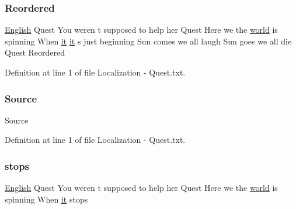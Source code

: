 \subsubsection{\texorpdfstring{Reordered}{Reordered}}
{\footnotesize\ttfamily \mbox{\hyperlink{_sphere_i_i_01_winter_01_project_2_config_2_localization_8txt_ad896b63205779b1b09e86d941ce13976}{English}} Quest You weren t supposed to help her Quest Here we the \mbox{\hyperlink{_sphere_i_i_01_music_01_boxes_2_config_2_localization_8txt_a7ede01351426b1b7f6c1ce5f794e474f}{world}} is spinning When \mbox{\hyperlink{_the_01_restless_01_curse_2_config_2_localization_01-_01_quest_8txt_a741b285909bea4855b886664c2dcd50c}{it}} \mbox{\hyperlink{_the_01_restless_01_curse_2_config_2_localization_01-_01_quest_8txt_a741b285909bea4855b886664c2dcd50c}{it}} s just beginning Sun comes we all laugh Sun goes we all die Quest Reordered}



Definition at line 1 of file Localization -\/ Quest.\+txt.

\mbox{\label{_the_01_restless_01_curse_2_config_2_localization_01-_01_quest_8txt_a176e1eca2d1e3d1c6a064340bc6a351e}} 
\subsubsection{\texorpdfstring{Source}{Source}}
{\footnotesize\ttfamily Source}



Definition at line 1 of file Localization -\/ Quest.\+txt.

\mbox{\label{_the_01_restless_01_curse_2_config_2_localization_01-_01_quest_8txt_a0eec7642499be29cf8e94cded536eb5e}} 
\subsubsection{\texorpdfstring{stops}{stops}}
{\footnotesize\ttfamily \mbox{\hyperlink{_sphere_i_i_01_winter_01_project_2_config_2_localization_8txt_ad896b63205779b1b09e86d941ce13976}{English}} Quest You weren t supposed to help her Quest Here we the \mbox{\hyperlink{_sphere_i_i_01_music_01_boxes_2_config_2_localization_8txt_a7ede01351426b1b7f6c1ce5f794e474f}{world}} is spinning When \mbox{\hyperlink{_the_01_restless_01_curse_2_config_2_localization_01-_01_quest_8txt_a741b285909bea4855b886664c2dcd50c}{it}} stops}



